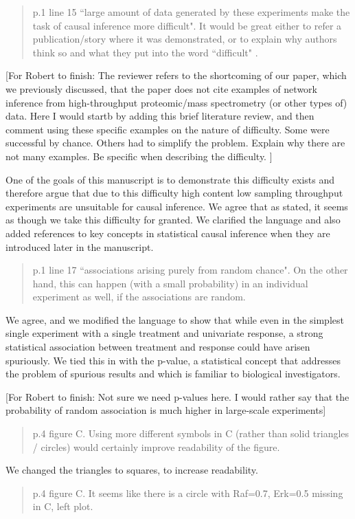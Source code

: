 \documentclass{letter}[11]
\def\todo#1{{\color{red}[For Robert to finish: #1]}}
\def\r#1{{\begin{quote}\textsf{\color{blue} #1}\end{quote}}}
\begin{document}
\r{p.1 line 15 ``large amount of data generated by these experiments make the task of causal inference more difficult".  It would be great either to refer a publication/story where it was demonstrated, or to explain why authors think so and what they put into the word ``difficult" .}

\todo{The reviewer refers to the shortcoming of our paper, which we previously discussed, that the paper does not cite examples of network inference from high-throughput proteomic/mass spectrometry (or other types of) data. Here I would startb by adding this brief literature review, and then comment using these specific examples on the nature of difficulty. Some were successful by chance. Others had to simplify the problem. Explain why there are not many examples. Be specific when describing the difficulty. }

One of the goals of this manuscript is to demonstrate this difficulty exists and therefore argue that due to this difficulty high content low sampling throughput experiments are unsuitable for causal inference.  We agree that as stated, it seems as though we take this difficulty for granted.  We clarified the language and also added references to key concepts in statistical causal inference when they are introduced later in the manuscript.

\r{p.1 line 17 ``associations arising purely from random chance". On the other hand, this can happen (with a small probability) in an individual experiment as well, if the associations are random.}

We agree, and we modified the language to show that while even in the simplest single experiment with a single treatment and univariate response, a strong statistical association between treatment and response could have arisen spuriously.  We tied this in with the p-value, a statistical concept that addresses the problem of spurious results and which is familiar to biological investigators.

\todo{Not sure we need p-values here. I would rather say that the probability of random association is much higher in large-scale experiments}

\r{p.4 figure C. Using more different symbols in C (rather than solid triangles / circles) would certainly improve readability of the figure.}

We changed the triangles to squares, to increase readability.

\r{p.4 figure C. It seems like there is a circle with Raf=0.7, Erk=0.5 missing in C, left plot.}
\end{document}
